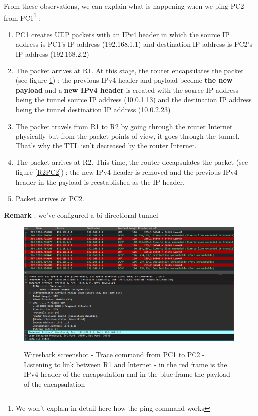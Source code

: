 \documentclass[10pt,a4paper]{ULBreport}
\begin{document}
From these observations, we can explain what is happening when we ping PC2 from PC1\footnote{We won't explain in detail here how the ping command works} : 


\begin{enumerate}
    \item PC1 creates UDP packets with an IPv4 header in which the source IP address is PC1's IP address (192.168.1.1) and destination IP address is PC2's IP address (192.168.2.2)
    \item The packet arrives at R1. At this stage, the router encapsulates the packet (see figure \ref{R1Int}) : the previous IPv4 header and payload become \textbf{the new payload} and a \textbf{new IPv4 header} is created with the source IP address being the tunnel source IP address (10.0.1.13) and the destination IP address being the tunnel destination IP address (10.0.2.23)
    \item The packet travels from R1 to R2 by going through the router Internet physically but from the packet points of view, it goes through the tunnel. That's why the TTL isn't decreased by the router Internet.
    \item The packet arrives at R2. This time, the router decapsulates the packet (see figure \ref{R2PC2}) : the new IPv4 header is removed and the previous IPv4 header in the payload is reestablished as the IP header.
    \item Packet arrives at PC2.
\end{enumerate}

\textbf{Remark} : we've configured a bi-directional tunnel

\begin{figure}[H]
    \caption{Wireshark screenshot - Trace command from PC1 to PC2 - Listening to link between R1 and Internet - in the red frame is the IPv4 header of the encapsulation and in the blue frame the payload of the encapsulation }
    \centering
    \includegraphics[width=\textwidth]{Images/traceWireR1Int.png}
    \label{R1Int}
\end{figure}
\end{document}
